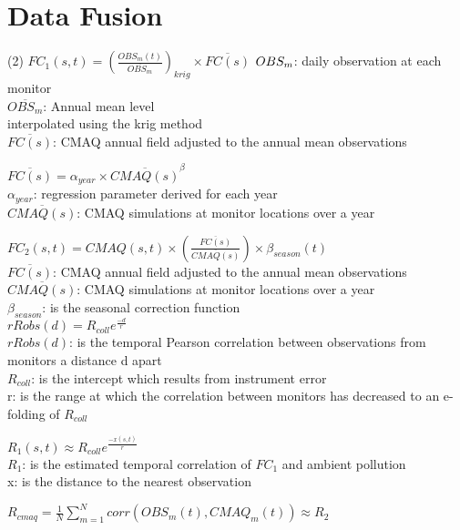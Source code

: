 \documentclass[12pt,a4paper]{article}
\begin{document}
\section*{Data Fusion}

\begin{tasks}(2)
\task  $FC_{1}(s,t) = (\frac{OBS_{m} (t)}{\overline{OBS_{m}}})_{krig} \times \overline{FC(s)}$
$\\OBS_{m}$: daily observation at each monitor \\ $\overline{OBS_{m}}$: Annual mean level \\
interpolated using the krig method \\
$ \overline{FC(s)}$: CMAQ annual field adjusted to the annual mean observations

\task $\overline{FC(s)} = \alpha_{year} \times \overline{CMAQ(s)}^{\beta}$\\

$ \alpha_{year}$: regression parameter derived for each year \\
$\overline{CMAQ(s)}$: CMAQ simulations at monitor locations over a year


\task  $FC_{2}(s,t) = CMAQ(s,t) \times (\frac{\overline{FC(s)}}{\overline{CMAQ(s)}}) \times \beta_{season}(t)$\\

$ \overline{FC(s)}$: CMAQ annual field adjusted to the annual mean observations\\
$\overline{CMAQ(s)}$: CMAQ simulations at monitor locations over a year\\
$\beta_{season}$: is the seasonal correction function \\


\task  $rR{obs}(d) = R_{coll}e^{\frac{-d}{r}}$\\

$rR{obs}(d)$: is the temporal Pearson correlation between observations from monitors a distance d apart\\
$R_{coll}$: is the intercept which results from instrument error\\
r: is the range at which the correlation between monitors has decreased to an e-folding of $R_{coll}$

\task  $R_{1}(s,t) \approx R_{coll}e^{\frac{-x(s,t)}{r}}$
\\
$R_{1}$:  is the estimated temporal correlation of $FC_{1}$ and ambient pollution\\
x: is the distance to the nearest observation


\task  $R_{cmaq} = \frac{1}{N} \sum_{m=1}^{N} corr(OBS_{m}(t), CMAQ_{m}(t)) \approx R_{2}$\\


\end{tasks}
\end{document}
